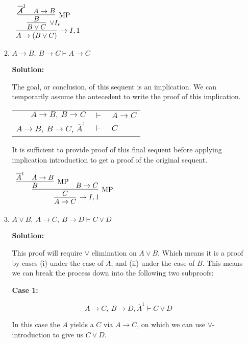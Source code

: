 \documentclass[11pt]{report}
\newcommand{\temp}[2]{{\overline{#2}}^{#1}}
\begin{document}
\begin{enumerate}
\begin{enumerate}
		\begin{center}
			$\begin{array}{c}
				\infer[\to I, 1]{A \to (B \lor C)}
					{\infer[\lor I_{r}]{B \lor C}
						{\infer[\MP]{B}
							{\temp{1}{\cancel{A}}
						&
						A \to B}}}
			\end{array}$
		\end{center}

		\newpage
		\item $ A\rightarrow  B, \  B \rightarrow  C \vdash  A\rightarrow  C $

		\textbf{Solution:}
		
		The goal, or conclusion, of this sequent is an implication. We can temporarily assume the antecedent to write the proof of this implication. 

		\begin{center}
			\begin{tabular}{r c l}
				$ A\rightarrow  B, \ B \rightarrow  C$ & $\vdash$ & $A \to C$ \\
				$ A\rightarrow  B, \ B \rightarrow C$, $\temp{1}{A}$ & $\vdash$ & $C$ \\				
			\end{tabular}
		\end{center}

		It is sufficient to provide proof of this final sequent before applying implication introduction to get a proof of the original sequent.

		\begin{center}
			$\begin{array}{c}
				\infer[\to I, 1]{A \to C}
					{\infer[\MP]{C}
						{\infer[\MP]{B}
							{\temp{1}{A}
							&
							A \to B}
						&
						B \to C}}
			\end{array}$
		\end{center}

		\item $A \lor B, \ A \to C, \ B \to D \vdash C \lor D$		
		
		\textbf{Solution:}

		This proof will require $\lor$ elimination on $A \lor B$. Which means it is a proof by cases (i) under the case of $A$, and (ii) under the case of $B$. This means we can break the process down into the following two subproofs: 

		\textbf{Case 1:}

		$$A \to C, \ B \to D, \temp{1}{A} \vdash C \lor D$$

		In this case the $A$ yields a $C$ via $A \to C$, on which we can use $\lor$-introduction to give us $C \lor D$. 


\end{enumerate}
\end{enumerate}
\end{document}
